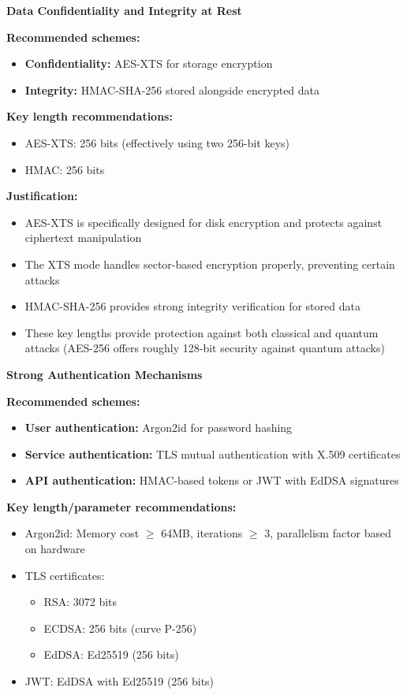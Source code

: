 \documentclass{article}
\begin{document}
\begin{enumerate}[label=\textbf{Task \arabic*:}]
\begin{tcolorbox}
		\bigskip
		\noindent\textbf{\large Data Confidentiality and Integrity at Rest}
		
		\noindent\textbf{Recommended schemes:}
		\begin{itemize}
			\item \textbf{Confidentiality:} AES-XTS for storage encryption
			\item \textbf{Integrity:} HMAC-SHA-256 stored alongside encrypted data
		\end{itemize}
		
		\noindent\textbf{Key length recommendations:}
		\begin{itemize}
			\item AES-XTS: 256 bits (effectively using two 256-bit keys)
			\item HMAC: 256 bits
		\end{itemize}
		
		\noindent\textbf{Justification:}
		\begin{itemize}
			\item AES-XTS is specifically designed for disk encryption and protects against ciphertext manipulation
			\item The XTS mode handles sector-based encryption properly, preventing certain attacks
			\item HMAC-SHA-256 provides strong integrity verification for stored data
			\item These key lengths provide protection against both classical and quantum attacks (AES-256 offers roughly 128-bit security against quantum attacks)
		\end{itemize}
		
		\bigskip
		\noindent\textbf{\large Strong Authentication Mechanisms}
		
		\noindent\textbf{Recommended schemes:}
		\begin{itemize}
			\item \textbf{User authentication:} Argon2id for password hashing
			\item \textbf{Service authentication:} TLS mutual authentication with X.509 certificates
			\item \textbf{API authentication:} HMAC-based tokens or JWT with EdDSA signatures
		\end{itemize}
		
		\noindent\textbf{Key length/parameter recommendations:}
		\begin{itemize}
			\item Argon2id: Memory cost $\geq$ 64MB, iterations $\geq$ 3, parallelism factor based on hardware
			\item TLS certificates: 
			\begin{itemize}
				\item RSA: 3072 bits
				\item ECDSA: 256 bits (curve P-256)
				\item EdDSA: Ed25519 (256 bits)
			\end{itemize}
			\item JWT: EdDSA with Ed25519 (256 bits)
		\end{itemize}
		

\end{tcolorbox}
\end{enumerate}
\end{document}
